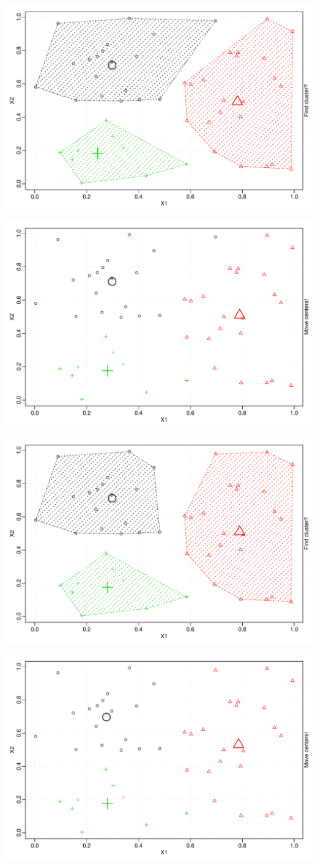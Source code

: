 \documentclass{beamer}\usepackage[]{graphicx}\usepackage[]{color}
\newenvironment{knitrout}{}{} %
\begin{document}
\begin{frame}
\begin{knitrout}
\includegraphics[width=.8\textwidth]{figures/unnamed-chunk-1-4} 

\includegraphics[width=.8\textwidth]{figures/unnamed-chunk-1-5} 

\includegraphics[width=.8\textwidth]{figures/unnamed-chunk-1-6} 

\includegraphics[width=.8\textwidth]{figures/unnamed-chunk-1-7} 


\end{knitrout}
\end{frame}
\end{document}
